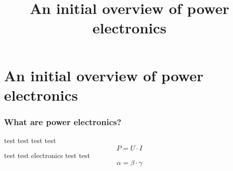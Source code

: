 \section{An initial overview of power electronics}
\title[Initial overview]{An initial overview of power electronics}  

\begin{frame}[plain]
    \titlepage
\end{frame}


\begin{frame}
	\frametitle{What are power electronics?}
	test test test test
	\begin{equation}
		\label{eq:power}
		P = U \cdot I
	\end{equation}
	test test electronics test test 
	\begin{equation}
		\alpha = \beta \cdot \gamma
	\end{equation}
\end{frame}